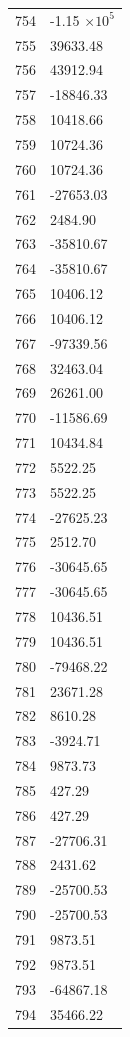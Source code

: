 \documentclass[a4paper,11pt]{article}
\begin{document}
\begin{center}
\begin{longtable}{|R{1.5cm}|R{2.5cm}|}
  754 &        -1.15 $\times 10^{           5}$ \\
  755 &     39633.48 \\
  756 &     43912.94 \\
  757 &    -18846.33 \\
  758 &     10418.66 \\
  759 &     10724.36 \\
  760 &     10724.36 \\
  761 &    -27653.03 \\
  762 &      2484.90 \\
  763 &    -35810.67 \\
  764 &    -35810.67 \\
  765 &     10406.12 \\
  766 &     10406.12 \\
  767 &    -97339.56 \\
  768 &     32463.04 \\
  769 &     26261.00 \\
  770 &    -11586.69 \\
  771 &     10434.84 \\
  772 &      5522.25 \\
  773 &      5522.25 \\
  774 &    -27625.23 \\
  775 &      2512.70 \\
  776 &    -30645.65 \\
  777 &    -30645.65 \\
  778 &     10436.51 \\
  779 &     10436.51 \\
  780 &    -79468.22 \\
  781 &     23671.28 \\
  782 &      8610.28 \\
  783 &     -3924.71 \\
  784 &      9873.73 \\
  785 &       427.29 \\
  786 &       427.29 \\
  787 &    -27706.31 \\
  788 &      2431.62 \\
  789 &    -25700.53 \\
  790 &    -25700.53 \\
  791 &      9873.51 \\
  792 &      9873.51 \\
  793 &    -64867.18 \\
  794 &     35466.22 \\

\end{longtable}
\end{center}
\end{document}
